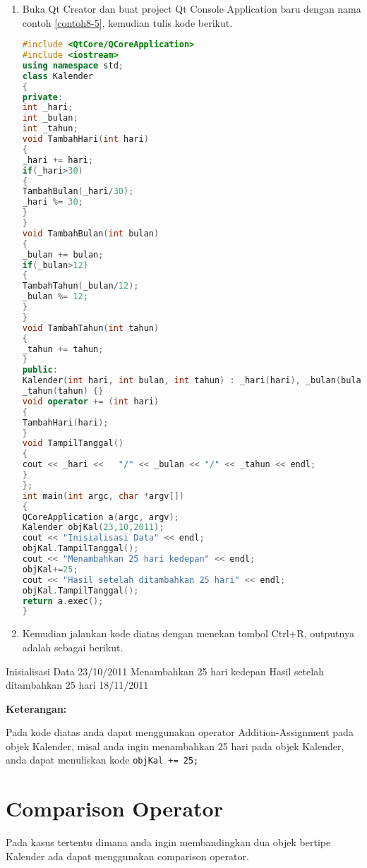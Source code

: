 \begin{enumerate}

\item
  Buka Qt Creator dan buat project Qt Console Application baru dengan
  nama contoh \ref{contoh8-5}, kemudian tulis kode berikut.

\begin{lstlisting}[language=c++, caption= Menggunakan Addition Assigment Operator dan Substraction
Assigment Operator, label=contoh8-5]
#include <QtCore/QCoreApplication>
#include <iostream>
using namespace std;
class Kalender
{
private:
int _hari;
int _bulan;
int _tahun;
void TambahHari(int hari)
{
_hari += hari;
if(_hari>30)
{
TambahBulan(_hari/30);
_hari %= 30;
}
}
void TambahBulan(int bulan)
{
_bulan += bulan;
if(_bulan>12)
{
TambahTahun(_bulan/12);
_bulan %= 12;
}
}
void TambahTahun(int tahun)
{
_tahun += tahun;
}
public:
Kalender(int hari, int bulan, int tahun) : _hari(hari), _bulan(bulan),
_tahun(tahun) {}
void operator += (int hari)
{
TambahHari(hari);
}
void TampilTanggal()
{
cout << _hari <<   "/" << _bulan << "/" << _tahun << endl;
}
};
int main(int argc, char *argv[])
{
QCoreApplication a(argc, argv);
Kalender objKal(23,10,2011);
cout << "Inisialisasi Data" << endl;
objKal.TampilTanggal();
cout << "Menambahkan 25 hari kedepan" << endl;
objKal+=25;
cout << "Hasil setelah ditambahkan 25 hari" << endl;
objKal.TampilTanggal();
return a.exec();
}
\end{lstlisting}
\item
  Kemudian jalankan kode diatas dengan menekan tombol Ctrl+R, outputnya
  adalah sebagai berikut.
\end{enumerate}

\begin{lcverbatim}
Inisialisasi Data
23/10/2011
Menambahkan 25 hari kedepan
Hasil setelah ditambahkan 25 hari
18/11/2011
\end{lcverbatim}

\textbf{Keterangan:}

Pada kode diatas anda dapat menggunakan operator Addition-Assignment
pada objek Kalender, misal anda ingin menambahkan 25 hari pada objek
Kalender, anda dapat menuliskan kode \texttt{objKal\ +=\ 25;}

\section{Comparison Operator}\label{comparison-operator}

Pada kasus tertentu dimana anda ingin membandingkan dua objek bertipe
Kalender ada dapat menggunakan comparison operator.


